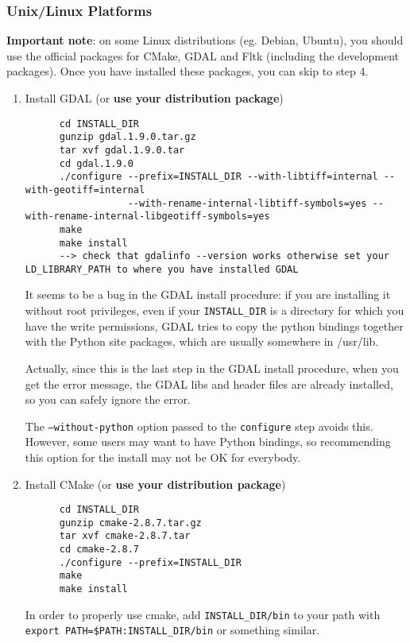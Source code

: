 \subsubsection{Unix/Linux Platforms}

\textbf{Important note}: on some Linux distributions (eg. Debian, Ubuntu), you should use
the official packages for CMake, GDAL and Fltk (including the development packages). Once you have installed these
packages, you can skip to step 4.

\begin{enumerate}

\item Install GDAL (or \textbf{use your distribution package})
  \begin{verbatim}
      cd INSTALL_DIR
      gunzip gdal.1.9.0.tar.gz
      tar xvf gdal.1.9.0.tar
      cd gdal.1.9.0
      ./configure --prefix=INSTALL_DIR --with-libtiff=internal --with-geotiff=internal 
                  --with-rename-internal-libtiff-symbols=yes --with-rename-internal-libgeotiff-symbols=yes 
      make
      make install
      --> check that gdalinfo --version works otherwise set your LD_LIBRARY_PATH to where you have installed GDAL 
  \end{verbatim}

It seems to be a bug in the GDAL install procedure: if you are installing it without root privileges, even if your \texttt{INSTALL\_DIR} is a directory for which you have the write permissions, GDAL tries to copy the python bindings together with the Python site packages, which are usually somewhere in /usr/lib.

Actually, since this is the last step in the GDAL install procedure, when you get the error message, the GDAL libs and header files are already installed, so you can safely ignore the error.

The \texttt{--without-python} option passed to the \texttt{configure} step avoids this. However, some users may want to have Python bindings, so recommending this option for the install may not be OK for everybody.

\item Install CMake (or \textbf{use your distribution package})
  \begin{verbatim}
      cd INSTALL_DIR
      gunzip cmake-2.8.7.tar.gz
      tar xvf cmake-2.8.7.tar
      cd cmake-2.8.7
      ./configure --prefix=INSTALL_DIR
      make
      make install
  \end{verbatim}
      In order to properly use cmake, add \texttt{INSTALL\_DIR/bin} to
      your path with \texttt{export PATH=\$PATH:INSTALL\_DIR/bin} or
      something similar.


\end{enumerate}
